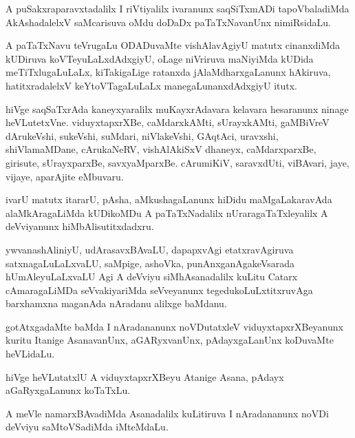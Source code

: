 \begin{mng}
A puSakxraparavxtadalilx I riVtiyalilx ivaranunx saqSiTxmADi tapoVbaladiMda AkAshadalelxV saMcarisuva oMdu doDaDx paTaTxNavanUnx nimiRsidaLu.
\end{mng}

\begin{mng}
A paTaTxNavu teVrugaLu ODADuvaMte vishAlavAgiyU matutx cinanxdiMda kUDiruva koVTeyuLaLxdAdxgiyU, oLage niVriruva maNiyiMda kUDida meTiTxlugaLuLaLx, kiTakigaLige ratanxda jAlaMdharxgaLanunx hAkiruva, hatitxradalelxV keYtoVTagaLuLaLx manegaLunanxdAdxgiyU itutx.
\end{mng}

\begin{mng}
hiVge saqSaTxrAda kaneyxyaralilx muKayxrAdavara kelavara hesaranunx ninage heVLutetxVne. viduyxtapxrXBe, caMdarxkAMti, sUrayxkAMti, gaMBiVreV dArukeVshi, sukeVshi, suMdari, niVlakeVshi, GAqtAci, uravxshi, shiVlamaMDane, cArukaNeRV, vishAlAkiSxV dhaneyx, caMdarxparxBe, girisute, sUrayxparxBe, savxyaMparxBe. cArumiKiV, saravxdUti, viBAvari, jaye, vijaye, aparAjite eMbuvaru.
\end{mng}

\begin{mng}
ivarU matutx itararU, pAsha, aMkushagaLanunx hiDidu maMgaLakaravAda alaMkAragaLiMda kUDikoMDu A paTaTxNadalilx nUraragaTaTxleyalilx A deVviyanunx hiMbAlisutitxdadxru.
\end{mng}

\begin{mng}
ywvanashAliniyU, udArasavxBAvaLU, dapapxvAgi etatxravAgiruva satxnagaLuLaLxvaLU, saMpige, ashoVka, punAnxganAgakeVsarada hUmAleyuLaLxvaLU Agi A deVviyu siMhAsanadalilx kuLitu Catarx cAmaragaLiMDa seVvakiyariMda seVveyanunx tegedukoLuLxtitxruvAga barxhamxna maganAda nAradanu alilxge baMdanu.
\end{mng}

\begin{mng}
gotAtxgadaMte baMda I nAradananunx noVDutatxleV viduyxtapxrXBeyanunx kuritu Itanige AsanavanUnx, aGARyxvanUnx, pAdayxgaLanUnx koDuvaMte heVLidaLu.
\end{mng}

\begin{mng}
hiVge heVLutatxlU A viduyxtapxrXBeyu Atanige Asana, pAdayx aGaRyxgaLanunx koTaTxLu.
\end{mng}

\begin{mng}
A meVle namarxBAvadiMda Asanadalilx kuLitiruva I nAradananunx noVDi deVviyu saMtoVSadiMda iMteMdaLu.
\end{mng}

